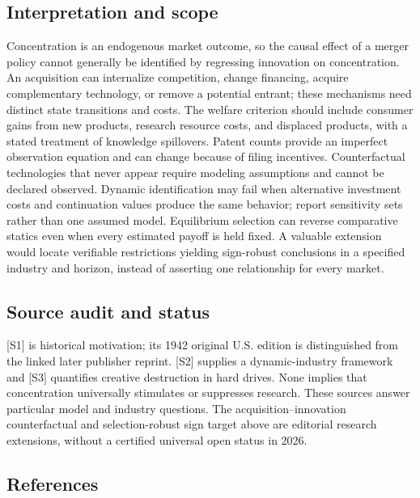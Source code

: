 \documentclass[11pt,a4paper]{article}
\begin{document}
\subsection*{Interpretation and scope}

Concentration is an endogenous market outcome, so the causal effect of a merger policy cannot generally be identified by regressing innovation on concentration. An acquisition can internalize competition, change financing, acquire complementary technology, or remove a potential entrant; these mechanisms need distinct state transitions and costs. The welfare criterion should include consumer gains from new products, research resource costs, and displaced products, with a stated treatment of knowledge spillovers. Patent counts provide an imperfect observation equation and can change because of filing incentives. Counterfactual technologies that never appear require modeling assumptions and cannot be declared observed. Dynamic identification may fail when alternative investment costs and continuation values produce the same behavior; report sensitivity sets rather than one assumed model. Equilibrium selection can reverse comparative statics even when every estimated payoff is held fixed. A valuable extension would locate verifiable restrictions yielding sign-robust conclusions in a specified industry and horizon, instead of asserting one relationship for every market.

\subsection*{Source audit and status}

[S1] is historical motivation; its 1942 original U.S. edition is distinguished from the linked later publisher reprint. [S2] supplies a dynamic-industry framework and [S3] quantifies creative destruction in hard drives. None implies that concentration universally stimulates or suppresses research. These sources answer particular model and industry questions. The acquisition--innovation counterfactual and selection-robust sign target above are editorial research extensions, without a certified universal open status in 2026.

\subsection*{References}
\end{document}
